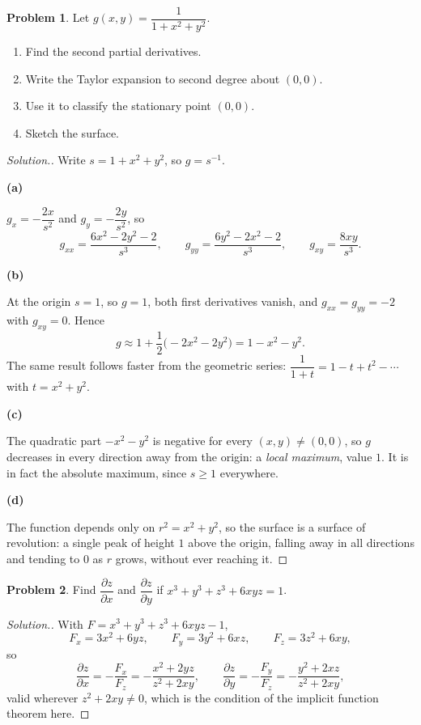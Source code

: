 \documentclass[11pt,a4paper]{article}
\theoremstyle{definition}
\newtheorem{problemx}{Problem}[subsection]
\newenvironment{problem}{\begin{problemx}}{\end{problemx}}
\newenvironment{solution}
  {\renewcommand{\qedsymbol}{}\begin{proof}[\textit{Solution}.]}
  {\end{proof}}
\newcommand{\subhead}[1]{%
  \par\medskip\noindent\textbf{#1}\par\nobreak\smallskip}
\begin{document}
\begin{problem}
Let $g(x,y) = \dfrac{1}{1+x^2+y^2}$.
\begin{enumerate}
\item[(a)] Find the second partial derivatives.
\item[(b)] Write the Taylor expansion to second degree about $(0,0)$.
\item[(c)] Use it to classify the stationary point $(0,0)$.
\item[(d)] Sketch the surface.
\end{enumerate}
\end{problem}
\begin{solution}
Write $s = 1+x^2+y^2$, so $g = s^{-1}$.

\subhead{(a)}
$g_x = -\dfrac{2x}{s^2}$ and $g_y = -\dfrac{2y}{s^2}$, so
$$g_{xx} = \frac{6x^2-2y^2-2}{s^3},\qquad
g_{yy} = \frac{6y^2-2x^2-2}{s^3},\qquad
g_{xy} = \frac{8xy}{s^3}.$$

\subhead{(b)}
At the origin $s=1$, so $g = 1$, both first derivatives vanish, and
$g_{xx} = g_{yy} = -2$ with $g_{xy} = 0$. Hence
$$g \approx 1 + \frac12\big(-2x^2 - 2y^2\big) = 1 - x^2 - y^2 .$$
The same result follows faster from the geometric series:
$\dfrac{1}{1+t} = 1-t+t^2-\cdots$ with $t = x^2+y^2$.

\subhead{(c)}
The quadratic part $-x^2-y^2$ is negative for every $(x,y)\neq(0,0)$, so $g$
decreases in every direction away from the origin: a \emph{local maximum}, value
$1$. It is in fact the absolute maximum, since $s\geq 1$ everywhere.

\subhead{(d)}
The function depends only on $r^2 = x^2+y^2$, so the surface is a surface of
revolution: a single peak of height $1$ above the origin, falling away in all
directions and tending to $0$ as $r$ grows, without ever reaching it.
\end{solution}

\begin{problem}
Find $\dfrac{\partial z}{\partial x}$ and $\dfrac{\partial z}{\partial y}$ if
$x^3+y^3+z^3+6xyz = 1$.
\end{problem}
\begin{solution}
With $F = x^3+y^3+z^3+6xyz-1$,
$$F_x = 3x^2+6yz,\qquad F_y = 3y^2+6xz,\qquad F_z = 3z^2+6xy ,$$
so
$$\frac{\partial z}{\partial x} = -\frac{F_x}{F_z}
= -\frac{x^2+2yz}{z^2+2xy},\qquad
\frac{\partial z}{\partial y} = -\frac{F_y}{F_z}
= -\frac{y^2+2xz}{z^2+2xy},$$
valid wherever $z^2+2xy\neq 0$, which is the condition of the implicit function
theorem here.
\end{solution}
\end{document}
